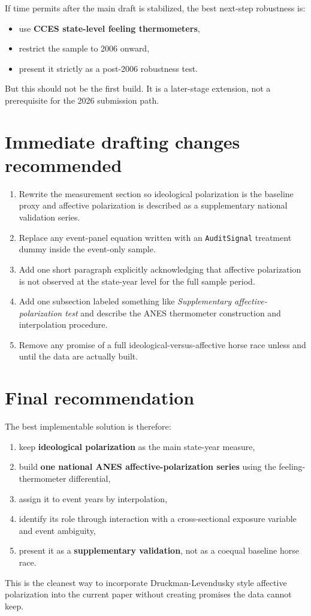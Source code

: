 \documentclass[12pt]{article}
\begin{document}
If time permits after the main draft is stabilized, the best next-step robustness is:
\begin{itemize}[leftmargin=1.5em]
    \item use \textbf{CCES state-level feeling thermometers},
    \item restrict the sample to 2006 onward,
    \item present it strictly as a post-2006 robustness test.
\end{itemize}

But this should not be the first build. It is a later-stage extension, not a prerequisite for the 2026 submission path.

\section{Immediate drafting changes recommended}

\begin{enumerate}[leftmargin=1.5em]
    \item Rewrite the measurement section so ideological polarization is the baseline proxy and affective polarization is described as a supplementary national validation series.
    \item Replace any event-panel equation written with an \texttt{AuditSignal} treatment dummy inside the event-only sample.
    \item Add one short paragraph explicitly acknowledging that affective polarization is not observed at the state-year level for the full sample period.
    \item Add one subsection labeled something like \textit{Supplementary affective-polarization test} and describe the ANES thermometer construction and interpolation procedure.
    \item Remove any promise of a full ideological-versus-affective horse race unless and until the data are actually built.
\end{enumerate}

\section{Final recommendation}

The best implementable solution is therefore:
\begin{enumerate}[leftmargin=1.5em]
    \item keep \textbf{ideological polarization} as the main state-year measure,
    \item build \textbf{one national ANES affective-polarization series} using the feeling-thermometer differential,
    \item assign it to event years by interpolation,
    \item identify its role through interaction with a cross-sectional exposure variable and event ambiguity,
    \item present it as a \textbf{supplementary validation}, not as a coequal baseline horse race.
\end{enumerate}

This is the cleanest way to incorporate Druckman-Levendusky style affective polarization into the current paper without creating promises the data cannot keep.
\end{document}
